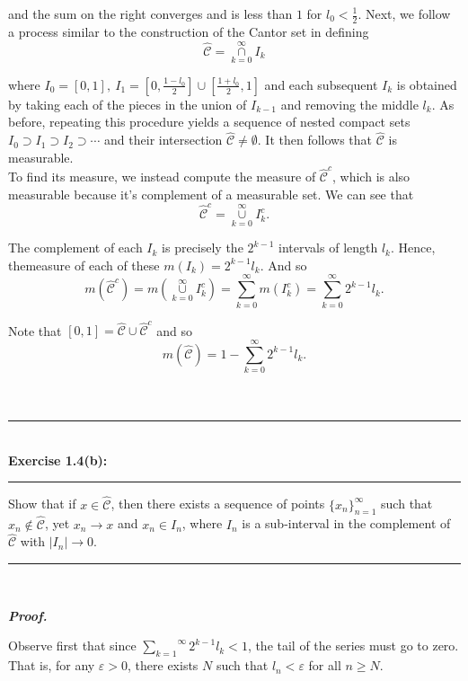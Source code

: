 \documentclass[a4paper,11pt]{article}
\begin{document}
and the sum on the right converges and is less than $1$ for $l_0 < \frac{1}{2}$. Next, we follow a process similar to the construction of the Cantor set in defining
	$$\hat{\mathcal{C}} = \overset{\infty}{\underset{k = 0}{\cap}} I_k$$

where $I_0 = [0,1],\ I_1 = [0, \frac{1 - l_0}{2}] \cup [\frac{1 + l_0}{2}, 1]$ and each subsequent $I_k$ is obtained by taking each of the pieces in the union of $I_{k-1}$ and removing the middle $l_k$. As before, repeating this procedure yields a sequence of nested compact sets $I_0 \supset I_1 \supset I_2 \supset \cdots$ and their intersection $\hat{\mathcal{C}} \neq \emptyset$. It then follows that $\hat{\mathcal{C}}$ is measurable.\\

To find its measure, we instead compute the measure of $\hat{\mathcal{C}}^c$, which is also measurable because it's complement of a measurable set. We can see that
	$$\hat{\mathcal{C}}^c = \overset{\infty}{\underset{k = 0}{\cup}} I_k^c.$$

The complement of each $I_k$ is precisely the $2^{k-1}$ intervals of length $l_k$. Hence, themeasure of each of these $m(I_k) = 2^{k-1} l_k$. And so
	$$m(\hat{\mathcal{C}}^c)
	= m\left( \overset{\infty}{\underset{k = 0}{\cup}} I_k^c \right)
	= \overset{\infty}{\underset{k = 0}{\sum}} m(I_k^c)
	= \overset{\infty}{\underset{k = 0}{\sum}} 2^{k-1} l_k.$$

Note that $[0,1] = \hat{\mathcal{C}} \cup \hat{\mathcal{C}}^c$ and so
	$$m(\hat{\mathcal{C}}) = 1 - \overset{\infty}{\underset{k = 0}{\sum}}2^{k-1} l_k.$$\\\\


\begin{flushleft}
	\rule[-0.5ex]{17cm}{2pt}\\
		\textbf{Exercise 1.4(b):}\\
	\rule[1.5ex]{17cm}{0.5pt}
		Show that if $x \in \hat{\mathcal{C}}$, then there exists a sequence of points $\{x_n\}_{n = 1}^\infty$ such that $x_n \notin \hat{\mathcal{C}}$, yet $x_n \to x$ and $x_n \in I_n$, where $I_n$ is a sub-interval in the complement of $\hat{\mathcal{C}}$ with $|I_n| \to 0$.
	\rule[1.0ex]{17cm}{0.5pt}\
\end{flushleft}

\textbf{\textit{Proof.}}

Observe first that since $\overset{\infty}{\underset{k = 1}{\sum}} 2^{k-1} l_k < 1$, the tail of the series must go to zero. That is, for any $\varepsilon > 0$, there exists $N$ such that $l_n < \varepsilon$ for all $n \geq N$.\\
\end{document}

